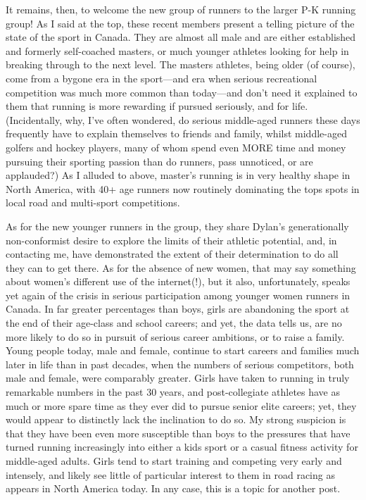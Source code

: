 It remains, then, to welcome the new group of runners to the larger P-K running group! As I said at the top, these recent members present a telling picture of the state of the sport in Canada. They are almost all male and are either established and formerly self-coached masters, or much younger athletes looking for help in breaking through to the next level. The masters athletes, being older (of course), come from a bygone era in the sport—and era when serious recreational competition was much more common than today—and don’t need it explained to them that running is more rewarding if pursued seriously, and for life. (Incidentally, why, I’ve often wondered, do serious middle-aged runners these days frequently have to explain themselves to friends and family, whilst middle-aged golfers and hockey players, many of whom spend even MORE time and money pursuing their sporting passion than do runners, pass unnoticed, or are applauded?) As I alluded to above, master’s running is in very healthy shape in North America, with 40+ age runners now routinely dominating the tops spots in local road and multi-sport competitions.

As for the new younger runners in the group, they share Dylan’s generationally non-conformist desire to explore the limits of their athletic potential, and, in contacting me, have demonstrated the extent of their determination to do all they can to get there. As for the absence of new women, that may say something about women’s different use of the internet(!), but it also, unfortunately, speaks yet again of the crisis in serious participation among younger women runners in Canada. In far greater percentages than boys, girls are abandoning the sport at the end of their age-class and school careers; and yet, the data tells us, are no more likely to do so in pursuit of serious career ambitions, or to raise a family. Young people today, male and female, continue to start careers and families much later in life than in past decades, when the numbers of serious competitors, both male and female, were comparably greater. Girls have taken to running in truly remarkable numbers in the past 30 years, and post-collegiate athletes have as much or more spare time as they ever did to pursue senior elite careers; yet, they would appear to distinctly lack the inclination to do so. My strong suspicion is that they have been even more susceptible than boys to the pressures that have turned running increasingly into either a kids sport or a casual fitness activity for middle-aged adults. Girls tend to start training and competing very early and intensely, and likely see little of particular interest to them in road racing as appears in North America today. In any case, this is a topic for another post.





